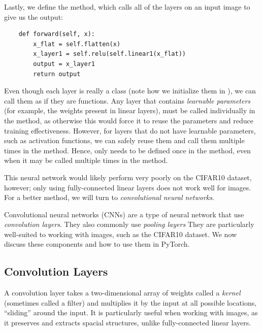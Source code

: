 Lastly, we define the  method, which calls all of the layers on an input image to give us the output:
\begin{lstlisting}
    def forward(self, x):
        x_flat = self.flatten(x)
        x_layer1 = self.relu(self.linear1(x_flat))
        output = x_layer1
        return output
\end{lstlisting}
Even though each layer is really a class (note how we initialize them in ), we can call them as if they are functions.
Any layer that contains \emph{learnable parameters} (for example, the weights present in linear layers), must be called individually in the  method, as otherwise this would force it to reuse the parameters and reduce training effectiveness.
However, for layers that do not have learnable parameters, such as activation functions, we can safely reuse them and call them multiple times in the  method.
Hence,  only needs to be defined once in the  method, even when it may be called multiple times in the  method.

This neural network would likely perform very poorly on the CIFAR10 dataset, however; only using fully-connected linear layers does not work well for images.
For a better method, we will turn to \emph{convolutional neural networks}.

Convolutional neural networks (CNNs) are a type of neural network that use \emph{convolution layers}.
They also commonly use \emph{pooling layers}
They are particularly well-suited to working with images, such as the CIFAR10 dataset.
We now discuss these components and how to use them in PyTorch.

\subsection*{Convolution Layers}
A convolution layer takes a two-dimensional array of weights called a \emph{kernel} (sometimes called a filter) and multiplies it by the input at all possible locations, ``sliding'' around the input.
It is particularly useful when working with images, as it preserves and extracts spacial structures, unlike fully-connected linear layers.

